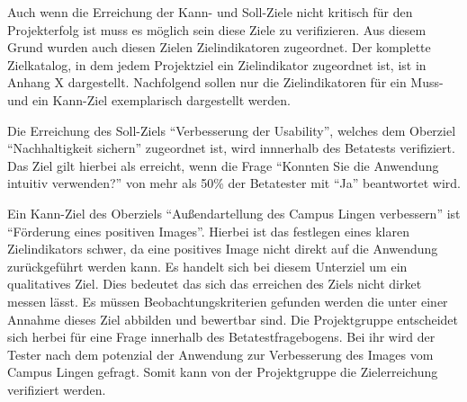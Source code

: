 Auch wenn die Erreichung der Kann- und Soll-Ziele nicht kritisch für den
Projekterfolg ist muss es möglich sein diese Ziele zu verifizieren. Aus diesem
Grund wurden auch diesen Zielen Zielindikatoren zugeordnet. Der komplette
Zielkatalog, in dem jedem Projektziel ein Zielindikator zugeordnet ist, ist in
Anhang X
dargestellt. Nachfolgend sollen nur die Zielindikatoren für ein Muss- und ein
Kann-Ziel exemplarisch dargestellt werden.


Die Erreichung des Soll-Ziels "`Verbesserung der Usability"', welches dem
Oberziel "`Nachhaltigkeit sichern"' zugeordnet ist, wird innnerhalb des
Betatests verifiziert. Das Ziel gilt hierbei als erreicht, wenn die Frage
"`Konnten Sie die Anwendung intuitiv verwenden?"' von mehr als 50\% der
Betatester mit "`Ja"' beantwortet wird.

Ein Kann-Ziel des Oberziels "`Außendartellung des Campus Lingen
verbessern"' ist "`Förderung eines positiven Images"'. Hierbei ist das festlegen
eines klaren Zielindikators schwer, da eine positives Image nicht direkt auf die
Anwendung zurückgeführt werden kann. Es handelt sich bei diesem Unterziel um ein
qualitatives Ziel. %
Dies bedeutet das sich das erreichen des Ziels nicht dirket messen lässt. Es
müssen Beobachtungskriterien gefunden werden die unter einer Annahme dieses Ziel
abbilden und bewertbar sind. Die Projektgruppe entscheidet sich herbei für eine
Frage innerhalb des Betatestfragebogens. Bei ihr wird der Tester nach dem
potenzial der Anwendung zur Verbesserung des Images vom Campus Lingen gefragt.
Somit kann von der Projektgruppe die Zielerreichung verifiziert werden.











